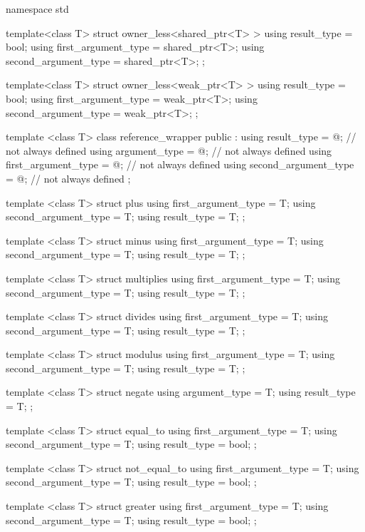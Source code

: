 %
%
%
%
\begin{codeblock}
namespace std {
  template<class T> struct owner_less<shared_ptr<T> > {
    using result_type          = bool;
    using first_argument_type  = shared_ptr<T>;
    using second_argument_type = shared_ptr<T>;
  };

  template<class T> struct owner_less<weak_ptr<T> > {
    using result_type          = bool;
    using first_argument_type  = weak_ptr<T>;
    using second_argument_type = weak_ptr<T>;
  };

  template <class T> class reference_wrapper {
  public :
    using result_type          = @\seebelow@; // not always defined
    using argument_type        = @\seebelow@; // not always defined
    using first_argument_type  = @\seebelow@; // not always defined
    using second_argument_type = @\seebelow@; // not always defined
  };

  template <class T> struct plus {
    using first_argument_type  = T;
    using second_argument_type = T;
    using result_type          = T;
  };

  template <class T> struct minus {
    using first_argument_type  = T;
    using second_argument_type = T;
    using result_type          = T;
  };

  template <class T> struct multiplies {
    using first_argument_type  = T;
    using second_argument_type = T;
    using result_type          = T;
  };

  template <class T> struct divides {
    using first_argument_type  = T;
    using second_argument_type = T;
    using result_type          = T;
  };

  template <class T> struct modulus {
    using first_argument_type  = T;
    using second_argument_type = T;
    using result_type          = T;
  };

  template <class T> struct negate {
    using argument_type = T;
    using result_type   = T;
  };

  template <class T> struct equal_to {
    using first_argument_type  = T;
    using second_argument_type = T;
    using result_type          = bool;
  };

  template <class T> struct not_equal_to {
    using first_argument_type  = T;
    using second_argument_type = T;
    using result_type          = bool;
  };

  template <class T> struct greater {
    using first_argument_type  = T;
    using second_argument_type = T;
    using result_type          = bool;
  };

}
\end{codeblock}
